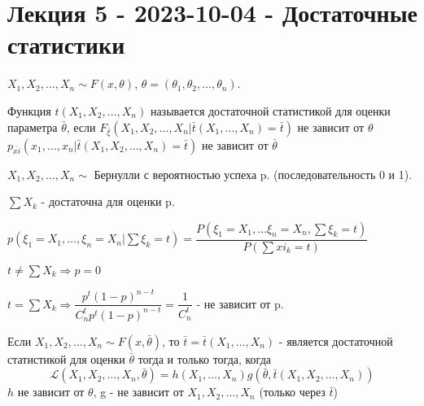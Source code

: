 \chapter{Лекция 5 - 2023-10-04 - Достаточные статистики}


$X_1, X_2, \dots, X_n \sim F(x, \theta)$, $\theta = (\theta_1, \theta_2, \dots, \theta_n)$.

\begin{definition}
  Функция $t(X_1, X_2, \dots, X_n)$ называется достаточной статистикой для оценки параметра $\bar{\theta}$, если $F_{\bar \xi} (X_1, X_2, \dots, X_n | \bar{t} (X_1, \dots, X_n) = \bar t)$ не зависит от $\theta$ 
  $p_\bar{xi} (x_1, \dots, x_n | \bar{t}(X_1, X_2, \dots, X_n) = \bar{t})$ не зависит от $\bar{\theta}$
\end{definition}

\begin{ex}
  $X_1, X_2, \dots, X_n \sim $ Бернулли с вероятностью успеха p. (последовательность 0 и 1).

  $\sum X_k$ - достаточна для оценки p.

  $p(\xi_1 = X_1, \dots, \xi_n = X_n | \sum \xi_k = t) = \dfrac{P(\xi_1 = X_1, \dots \xi_n = X_n, \sum \xi_k = t)}{P(\sum xi_k = t)}$

  $t \neq \sum X_k \Rightarrow p = 0 $

  $t = \sum X_k \Rightarrow \dfrac{ p^t (1-p)^{n-t} }{ C_n^t p^t (1-p)^{n-t} } = \dfrac{1}{C_n^t}$ - не зависит от p. 
\end{ex}

\begin{theorem}
  Если $X_1, X_2, \dots, X_n \sim F(x, \bar\theta)$, то $\bar t = \bar t (X_1, \dots, X_n)$ - является достаточной статистикой для оценки $\bar\theta$ тогда и только тогда, когда 
  \[
    \mathcal{L}(X_1, X_2, \dots, X_n, \bar\theta) = h(X_1, \dots, X_n) g(\bar\theta, \bar t (X_1, X_2, \dots, X_n))
  \]
  $h$ не зависит от $\theta$, g - не зависит от $X_1, X_2, \dots, X_n$ (только через $\bar t$)
\end{theorem}

